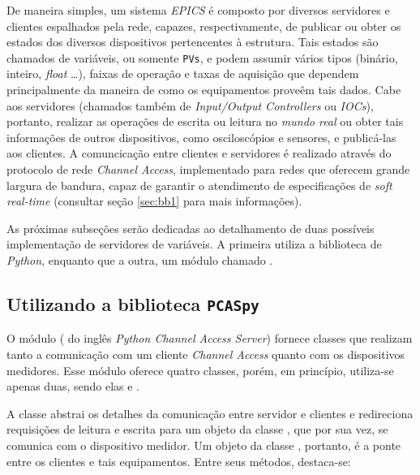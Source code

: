 De maneira simples, um sistema \textit{EPICS} é composto por diversos
servidores e clientes espalhados pela rede, capazes, respectivamente, de
publicar ou obter os estados dos diversos dispositivos pertencentes à estrutura.
Tais estados são chamados de variáveis, ou somente \texttt{PVs}, e podem
assumir vários tipos (binário, inteiro, \textit{float} \ldots), faixas de
operação e taxas de aquisição que dependem principalmente da maneira de como os
equipamentos proveêm tais dados. Cabe aos servidores (chamados também de
\textit{Input/Output Controllers} ou \textit{IOCs}), portanto, realizar as
operações de escrita ou leitura no \textit{mundo real} ou obter tais informações
de outros dispositivos, como osciloscópios e sensores, e publicá-las aos
clientes. A comuncicação entre clientes e servidores é realizado através do
protocolo de rede \textit{Channel Access}, implementado para redes que oferecem
grande largura de bandura, capaz de garantir o atendimento de especificações de
\textit{soft real-time} (consultar seção \ref{sec:bb1} para mais informações).

\vspace{12pt}

As próximas subseções serão dedicadas ao detalhamento de duas possíveis
implementação de servidores de variáveis. A primeira utiliza a biblioteca
 de \textit{Python}, enquanto que a outra, um módulo chamado
.

\subsection{Utilizando a biblioteca \texttt{PCASpy}}

O módulo  ( do inglês \textit{Python Channel Access
Server}) fornece classes que realizam tanto a comunicação com um cliente
\textit{Channel Access} quanto com os dispositivos medidores. Esse módulo
oferece quatro classes, porém, em princípio, utiliza-se apenas duas, sendo elas
 e .

\vspace{12pt}

A classe  abstrai os detalhes da comunicação entre servidor e
clientes e redireciona requisições de leitura e escrita para um objeto da classe
, que por sua vez, se comunica com o dispositivo medidor. Um objeto
da classe , portanto, é a ponte entre os clientes e tais
equipamentos. Entre seus métodos, destaca-se:

